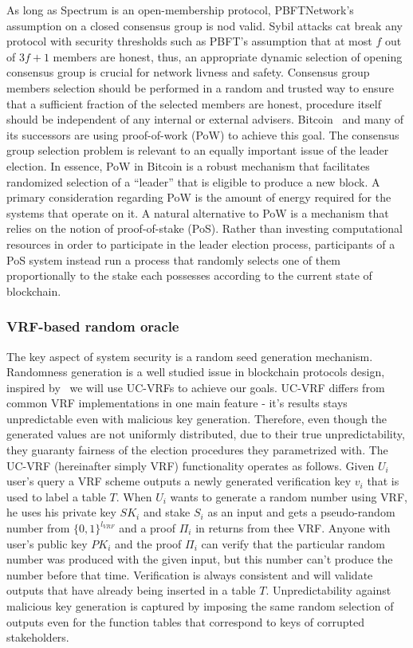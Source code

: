 As long as Spectrum is an open-membership protocol, PBFTNetwork's assumption on a closed consensus group is nod valid.
Sybil attacks cat break any protocol with security thresholds such as PBFT's assumption that at most $f$ out of ${3 f + 1}$ members are honest, thus, an appropriate dynamic selection of opening consensus group is crucial for network livness and safety.
Consensus group members selection should be performed in a random and trusted way to ensure that a sufficient fraction of the selected members are honest, procedure itself should be independent of any internal or external advisers.
Bitcoin~\cite{nakamoto2009bitcoin} and many of its successors are using proof-of-work (PoW) to achieve this goal.
The consensus group selection problem is relevant to an equally important issue of the leader election.
In essence, PoW in Bitcoin is a robust mechanism that facilitates randomized selection of a \enquote{leader} that is eligible to produce a new block.
A primary consideration regarding PoW is the amount of energy required for the systems that operate on it.
A natural alternative to PoW is a mechanism that relies on the notion of proof-of-stake (PoS).
Rather than investing computational resources in order to participate in the leader election process, participants of a PoS system instead run a process that randomly selects one of them proportionally to the stake each possesses according to the current state of blockchain.

\subsubsection{VRF-based random oracle}

The key aspect of system security is a random seed generation mechanism.
Randomness generation is a well studied issue in blockchain protocols design, inspired by~\cite{cryptoeprint:2017/573} we will use UC-VRFs to achieve our goals.
UC-VRF differs from common VRF implementations in one main feature - it's results stays unpredictable even with malicious key generation.
Therefore, even though the generated values are not uniformly distributed, due to their true unpredictability, they guaranty fairness of the election procedures they parametrized with.
The UC-VRF (hereinafter simply VRF) functionality operates as follows.
Given $U_i$ user's query a VRF scheme outputs a newly generated verification key $v_i$ that is used to label a table $T$.
When $U_i$ wants to generate a random number using VRF, he uses his private key $SK_i$ and stake $S_i$ as an input and gets a pseudo-random number from ${\{0, 1\}^{l_{VRF}}}$ and a proof $\Pi_i$ in returns from thee VRF\@.
Anyone with user's public key $PK_i$ and the proof $\Pi_i$ can verify that the particular random number was produced with the given input, but this number can't produce the number before that time.
Verification is always consistent and will validate outputs that have already being inserted in a table $T$.
Unpredictability against malicious key generation is captured by imposing the same random selection of outputs even for the function tables that correspond to keys of corrupted stakeholders.

